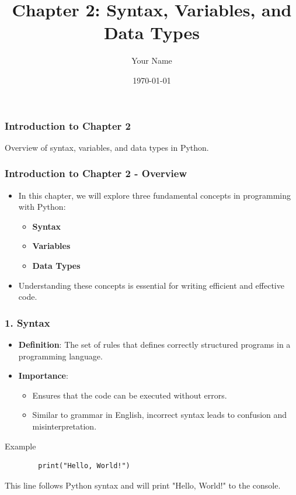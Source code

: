 \documentclass{beamer}
\title{Chapter 2: Syntax, Variables, and Data Types}
\author{Your Name}
\institute{Your Institution}
\date{\today}
\begin{document}
\frame{\titlepage}

\begin{frame}
    \frametitle{Introduction to Chapter 2}
    Overview of syntax, variables, and data types in Python.
\end{frame}

\begin{frame}
    \frametitle{Introduction to Chapter 2 - Overview}
    \begin{itemize}
        \item In this chapter, we will explore three fundamental concepts in programming with Python: 
        \begin{itemize}
            \item \textbf{Syntax}
            \item \textbf{Variables}
            \item \textbf{Data Types}
        \end{itemize}
        \item Understanding these concepts is essential for writing efficient and effective code.
    \end{itemize}
\end{frame}

\begin{frame}
    \frametitle{1. Syntax}
    \begin{itemize}
        \item \textbf{Definition}: The set of rules that defines correctly structured programs in a programming language.
        \item \textbf{Importance}: 
        \begin{itemize}
            \item Ensures that the code can be executed without errors.
            \item Similar to grammar in English, incorrect syntax leads to confusion and misinterpretation.
        \end{itemize}
    \end{itemize}
    \begin{block}{Example}
        \begin{lstlisting}
        print("Hello, World!")
        \end{lstlisting}
        This line follows Python syntax and will print "Hello, World!" to the console.
    \end{block}
\end{frame}
\end{document}
